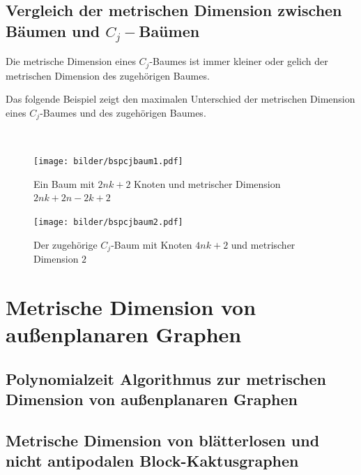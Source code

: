 \section{Vergleich der metrischen Dimension zwischen Bäumen und $C_j-$Baümen}
\begin{lem}
Die metrische Dimension eines $C_j$-Baumes ist immer kleiner oder gelich der metrischen Dimension des zugehörigen Baumes.
\end{lem}
Das folgende Beispiel zeigt den maximalen Unterschied der metrischen Dimension eines $C_j$-Baumes und des zugehörigen Baumes.
\begin{bsp}~\newline
\begin{figure}[ht]
\centering
\texttt{[image: bilder/bspcjbaum1.pdf]}
\caption{Ein Baum mit $2nk+2$ Knoten und metrischer Dimension $2nk+2n-2k+2$}
\end{figure}
\begin{figure}[ht]
\centering
\texttt{[image: bilder/bspcjbaum2.pdf]}
\caption{Der zugehörige $C_j$-Baum mit Knoten $4nk+2$ und metrischer Dimension $2$}
\end{figure}
\end{bsp}

\chapter{Metrische Dimension von außenplanaren Graphen%
}
\label{aussenpalanar}
\section{Polynomialzeit Algorithmus zur metrischen Dimension von außenplanaren Graphen}
\section{Metrische Dimension von blätterlosen und nicht antipodalen Block-Kaktusgraphen}
